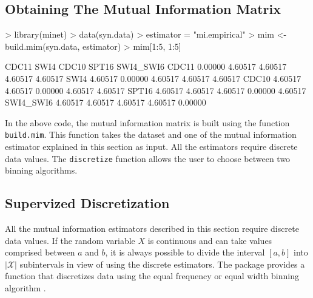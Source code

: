 \documentclass{article}
\newcommand{\Rfunction}[1]{{\texttt{#1}}}
\begin{document}
\subsection{Obtaining The Mutual Information Matrix}
\begin{Schunk}
\begin{Sinput}
> library(minet)
> data(syn.data)
> estimator = "mi.empirical"
> mim <- build.mim(syn.data, estimator)
> mim[1:5, 1:5]
\end{Sinput}
\begin{Soutput}
            CDC11    SWI4   CDC10   SPT16 SWI4_SWI6
CDC11     0.00000 4.60517 4.60517 4.60517   4.60517
SWI4      4.60517 0.00000 4.60517 4.60517   4.60517
CDC10     4.60517 4.60517 0.00000 4.60517   4.60517
SPT16     4.60517 4.60517 4.60517 0.00000   4.60517
SWI4_SWI6 4.60517 4.60517 4.60517 4.60517   0.00000
\end{Soutput}
\end{Schunk}
In the above code, the mutual information matrix is built using the function 
\Rfunction{build.mim}. This function takes the dataset and one of the mutual 
information estimator explained in this section as input. All the estimators require discrete data values. The \Rfunction{discretize} function 
allows the user to choose between two binning
algorithms.
 
\subsection{Supervized Discretization}

All the mutual information estimators described in this section require discrete data values.
If the random variable $X$ is continuous and can take values comprised between
$a$ and $b$, it is always possible to divide the interval $[a, b]$ into $|\mathcal{X}|$ subintervals
in view of using the discrete estimators.
The package provides a function that discretizes data using the equal frequency or equal width
binning algorithm \cite{discretize}.
\end{document}
